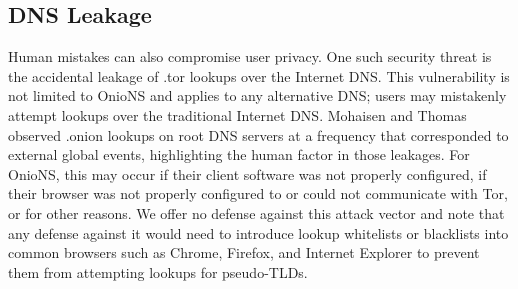 %
%
%

\subsection{DNS Leakage}

Human mistakes can also compromise user privacy. One such security threat is the accidental leakage of .tor lookups over the Internet DNS. This vulnerability is not limited to OnioNS and applies to any alternative DNS; users may mistakenly attempt lookups over the traditional Internet DNS. Mohaisen and Thomas observed .onion lookups on root DNS servers at a frequency that corresponded to external global events, highlighting the human factor in those leakages\cite{thomasmeasuring}. For OnioNS, this may occur if their client software was not properly configured, if their browser was not properly configured to or could not communicate with Tor, or for other reasons. We offer no defense against this attack vector and note that any defense against it would need to introduce lookup whitelists or blacklists into common browsers such as Chrome, Firefox, and Internet Explorer to prevent them from attempting lookups for pseudo-TLDs.

